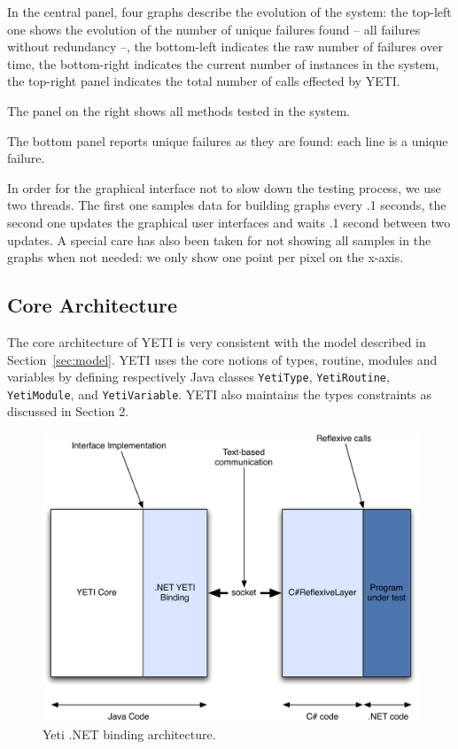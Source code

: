 In the central panel, four graphs describe the evolution of the system: the top-left one shows 
the evolution of the number of unique failures found -- all failures without redundancy --, the 
bottom-left indicates the raw number of failures over time, the bottom-right indicates the current 
number of instances in the system, the top-right panel indicates the total number of calls effected by YETI.

The panel on the right shows all methods tested in the system.

The bottom panel reports unique failures as they are found: each line is a unique failure.

In order for the graphical interface not to slow down the testing process, we use two threads.
The first one samples data for building graphs every .1 seconds, the second one updates the graphical user interfaces and waits .1 second between two updates. A special care has also been taken for not showing all samples in the graphs when not needed: we only show one point per pixel on the x-axis.

\subsection{Core Architecture}
The core architecture of YETI is very consistent with the model described in Section~\ref{sec:model}.
YETI uses the core notions of types, routine, modules and variables by defining respectively Java classes 
\texttt{YetiType}, \texttt{YetiRoutine}, \texttt{YetiModule}, and \texttt{YetiVariable}.
YETI also maintains the types constraints as discussed in Section 2.

\begin{figure}[h]
\begin{center}
\includegraphics[width=\columnwidth]{images/Architecture.pdf}
\end{center}
\caption{Yeti .NET binding architecture.}\label{fig:archi}
\end{figure}

